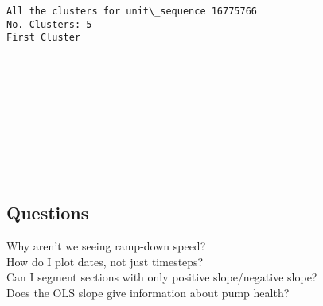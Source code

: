 \documentclass[11pt]{article}
\begin{document}
    \begin{Verbatim}[commandchars=\\\{\}]
All the clusters for unit\_sequence 16775766
No. Clusters: 5
First Cluster

    \end{Verbatim}

    \begin{center}
    \end{center}
    { \hspace*{\fill} \\}
    
    \begin{center}
    \end{center}
    { \hspace*{\fill} \\}
    
    \begin{center}
    \end{center}
    { \hspace*{\fill} \\}
    
    \begin{center}
    \end{center}
    { \hspace*{\fill} \\}
    
    \begin{center}
    \end{center}
    { \hspace*{\fill} \\}
    
    \subsection{Questions}\label{questions}

Why aren't we seeing ramp-down speed?\\
How do I plot dates, not just timesteps?\\
Can I segment sections with only positive slope/negative slope?\\
Does the OLS slope give information about pump health?
\end{document}

